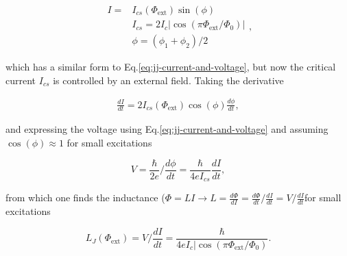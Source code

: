     \begin{equation}
      \begin{aligned}
        I = & I_{cs}(\Phi_\text{ext})\sin(\phi)\\
        & I_{cs} = 2I_c|\cos(\pi\Phi_\text{ext}/\Phi_0)|\\
        & \phi = (\phi_1+\phi_2)/2
      \end{aligned},
    \end{equation}

    \noindent      which      has       a      similar      form      to
    Eq.\eqref{eq:jj-current-and-voltage}, but  now the  critical current
    $I_{cs}$ is controlled by an external field. Taking the derivative

    \begin{equation}
      \begin{aligned}
        \frac{dI}{dt}=2I_{cs}(\Phi_\text{ext})\cos(\phi)\frac{d\phi}{dt},
      \end{aligned}
    \end{equation}

    \noindent      and      expressing       the      voltage      using
    Eq.\eqref{eq:jj-current-and-voltage}           and          assuming
    $\cos(\phi)\approx1$ for small excitations

    \begin{equation}
      V = \frac{\hbar}{2e}/\frac{d\phi}{dt} = \frac{\hbar}{4eI_{cs}}\frac{dI}{dt},
    \end{equation}

    \noindent     from     which     one    finds     the     inductance
    ($\Phi    =    LI    \rightarrow     L    =    \frac{d\Phi}{dI}    =
    \frac{d\Phi}{dt}/\frac{dI}{dt}    =     V/\frac{dI}{dt}$for    small
    excitations

    \begin{equation}
      L_J(\Phi_\text{ext}) = V/\frac{dI}{dt} = \frac{\hbar}{4eI_c|\cos(\pi\Phi_\text{ext}/\Phi_0)}.
    \end{equation}
    \vspace{6ex}

